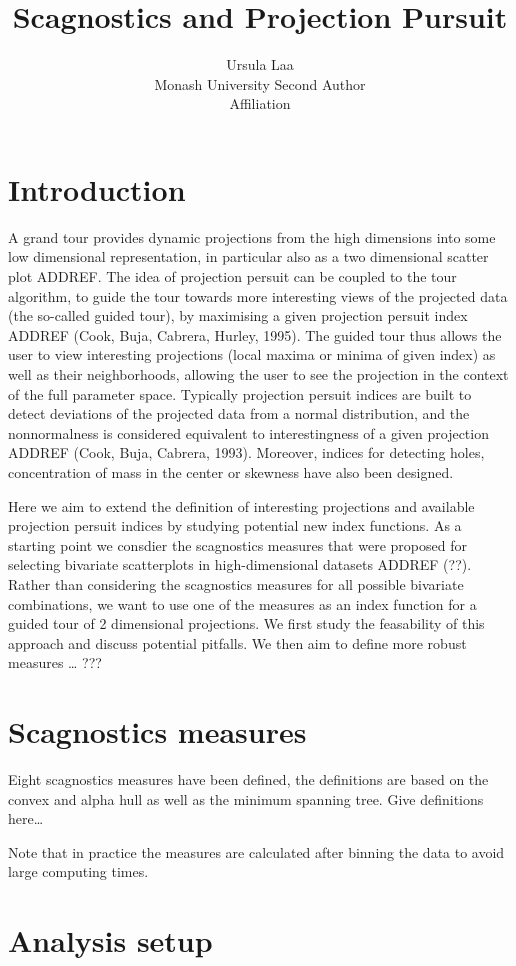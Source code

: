 \documentclass[article]{jss}
\author{
Ursula Laa\\Monash University \And Second Author\\Affiliation
}
\title{Scagnostics and Projection Pursuit}
\begin{document}
\section{Introduction}\label{introduction}

A grand tour provides dynamic projections from the high dimensions into
some low dimensional representation, in particular also as a two
dimensional scatter plot ADDREF. The idea of projection persuit can be
coupled to the tour algorithm, to guide the tour towards more
interesting views of the projected data (the so-called guided tour), by
maximising a given projection persuit index ADDREF (Cook, Buja, Cabrera,
Hurley, 1995). The guided tour thus allows the user to view interesting
projections (local maxima or minima of given index) as well as their
neighborhoods, allowing the user to see the projection in the context of
the full parameter space. Typically projection persuit indices are built
to detect deviations of the projected data from a normal distribution,
and the nonnormalness is considered equivalent to interestingness of a
given projection ADDREF (Cook, Buja, Cabrera, 1993). Moreover, indices
for detecting holes, concentration of mass in the center or skewness
have also been designed.

Here we aim to extend the definition of interesting projections and
available projection persuit indices by studying potential new index
functions. As a starting point we consdier the scagnostics measures that
were proposed for selecting bivariate scatterplots in high-dimensional
datasets ADDREF (??). Rather than considering the scagnostics measures
for all possible bivariate combinations, we want to use one of the
measures as an index function for a guided tour of 2 dimensional
projections. We first study the feasability of this approach and discuss
potential pitfalls. We then aim to define more robust measures \ldots{}
???

\section{Scagnostics measures}\label{scagnostics-measures}

Eight scagnostics measures have been defined, the definitions are based
on the convex and alpha hull as well as the minimum spanning tree. Give
definitions here\ldots{}

Note that in practice the measures are calculated after binning the data
to avoid large computing times.

\section{Analysis setup}\label{analysis-setup}
\end{document}
